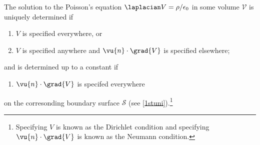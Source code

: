 \documentclass[english,a4paper,12pt]{report}
\begin{document}
\begin{theorem}
The solution to the Poisson's equation \(\laplacian V = \rho /\epsilon_0 \) in some volume \(\mathcal{V}\) is uniquely determined if 

\begin{enumerate}
    \item \(V\) is specified everywhere, or
    \item \(V\) is specified anywhere and \(\vu{n} \cdot \grad{V} \) is specified elsewhere; 
\end{enumerate}

and is determined up to a constant if

\begin{enumerate}
    \item \(\vu{n} \cdot \grad{V} \) is specifed everywhere 
\end{enumerate}

on the corresonding boundary surface \(\mathcal{S}\) (see \cref{1stuni}).\footnote{Specifying \(V\) is known as the Dirichlet condition and specifying \(\vu{n} \cdot \grad{V} \) is known as the Neumann condition.}  


\end{theorem}
\end{document}
